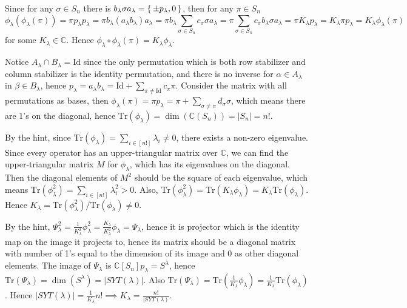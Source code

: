 \documentclass{myhw}
\newcommand{\id}{\text{Id}}
\newcommand{\tr}{\text{Tr}}
\begin{document}
\begin{homeworkProblem}
\begin{homeworkSection}
Since for any $\sigma \in S_n$ there is $b_\lambda \sigma a_\lambda = \set{\pm p_\lambda, 0}$, then for any $\pi \in S_n$ \[
\phi_\lambda(\phi_\lambda(\pi))=\pi p_\lambda p_\lambda=\pi b_\lambda (a_\lambda b_\lambda) a_\lambda = \pi b_\lambda \sum _{\sigma \in S_n}c_\sigma \sigma a_\lambda = \pi \sum_{\sigma \in S_n}c_\sigma b_\lambda \sigma a_\lambda=\pi K_\lambda p_\lambda=K_\lambda \pi p_\lambda=K_\lambda \phi_\lambda(\pi)
\] for some $K_\lambda \in \mathbb{C}$.
Hence $\phi_\lambda \circ \phi_\lambda(\pi)=K_\lambda\phi_\lambda$.
\end{homeworkSection}
\begin{homeworkSection}
Notice $A_\lambda \cap B_\lambda= \id$ since the only permutation which is both row stabilizer and column stabilizer is the identity permutation, and there is no inverse for $\alpha \in A_\lambda$ in $\beta \in B_\lambda$, hence $p_\lambda=a_\lambda b_\lambda=\id + \sum_{\pi \neq \id}c_\pi \pi$. Consider the matrix with all permutations as bases, then $\phi_\lambda(\pi)=\pi p_\lambda = \pi + \sum_{\sigma \neq \pi}d_\sigma \sigma$, which means there are 1's on the diagonal, hence $\tr(\phi_\lambda)=\dim(\mathbb{C}(S_n))=|S_n|=n!$. 
\end{homeworkSection}
\begin{homeworkSection}
By the hint, since $\tr(\phi_\lambda)=\sum_{i \in [n!]} \lambda_i \neq 0$, there exists a non-zero eigenvalue. Since every operator has an upper-triangular matrix over $\mathbb{C}$, we can find the upper-triangular matrix $M$ for $\phi_\lambda$, which has its eigenvalues on the diagonal. Then the diagonal elements of $M^2$ should be the square of each eigenvalue, which means $\tr(\phi_\lambda^2)=\sum _{i \in [n!]} \lambda_i^2 >0$. Also, $\tr(\phi_\lambda^2)=\tr(K_\lambda \phi_\lambda)=K_\lambda \tr(\phi_\lambda)$. Hence $K_\lambda = \tr(\phi_\lambda^2)/\tr(\phi_\lambda) \neq 0$. 
\end{homeworkSection}
\begin{homeworkSection}
By the hint, $\Psi_\lambda^2=\frac{1}{K_\lambda^2}\phi_\lambda^2=\frac{K_\lambda}{K_\lambda^2}\phi_\lambda=\Psi_\lambda$, hence it is projector which is the identity map on the image it projects to, hence its matrix should be a diagonal matrix with number of 1's equal to the dimension of its image and 0 as other diagonal elements. The image of $\Psi_\lambda$ is $\mathbb{C}[S_n]p_\lambda=S^\lambda$, hence $\tr(\Psi_\lambda)=\dim(S^\lambda)=|SYT(\lambda)|$. Also $\tr(\Psi_\lambda)=\tr(\frac{1}{K_\lambda}\phi_\lambda)= \frac{1}{K_\lambda}\tr(\phi_\lambda)$. Hence $|SYT(\lambda)|=\frac{1}{K_\lambda}n! \implies K_\lambda = \frac{n!}{|SYT(\lambda)}$.
\end{homeworkSection}
\end{homeworkProblem}
\end{document}
